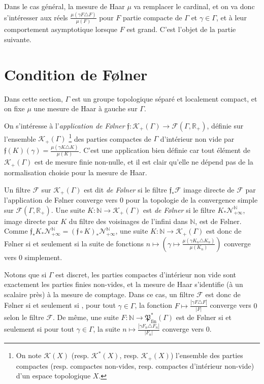 \documentclass[a4paper,12pt]{article}
\newcommand{\R}{\mathbb{R}}
\newcommand{\N}{\mathbb{N}}
\newcommand{\abs}[1]{\left\vert#1\right\vert}
\newcommand{\card}[1]{\abs{#1}}
\newcommand{\ssi}{si et seulement si }
\newcommand{\comp}{\circ}
\newcommand{\nhds}{\mathcal{N}}
\newcommand{\finparts}{\mathfrak{P}_{\mathrm{fin}}}
\begin{document}
Dans le cas général, la mesure de Haar $\mu$ va remplacer le cardinal, et on va donc s'intéresser aux réels $\frac{\mu(\gamma F \triangle F)}{\mu(F)}$ 
pour $F$ partie compacte de $\Gamma$ et $\gamma\in\Gamma$, et à leur comportement asymptotique
lorsque $F$ est grand. C'est l'objet de la partie suivante.

\section{Condition de F\o{}lner}

Dans cette section, $\Gamma$ est un groupe topologique séparé et localement compact, et on fixe 
$\mu$ une mesure de Haar à gauche sur $\Gamma$.

On s'intéresse à l'\emph{application de F\o{}lner} $\mathfrak{f} : \mathcal{K}_+(\Gamma) \to \mathcal{F}(\Gamma, \R_+)$, définie sur l'ensemble 
$\mathcal{K}_+(\Gamma)$
\footnote{On note $\mathcal{K}(X)$ (resp. $\mathcal{K}^*(X)$, resp. $\mathcal{K}_+(X)$) l'ensemble des parties compactes 
(resp. compactes non-vides, resp. compactes d'intérieur non-vide) d'un espace topologique $X$. }
des parties compactes de $\Gamma$ d'intérieur non vide par $\mathfrak{f}(K)(\gamma) = \frac{\mu(\gamma K \triangle K)}{\mu(K)}$.
C'est une application bien définie car tout élément de $\mathcal{K}_+(\Gamma)$ est de mesure finie non-nulle,
et il est clair qu'elle ne dépend pas de la normalisation choisie pour la mesure de Haar.

Un filtre $\mathscr{F}$ sur $\mathcal{K}_+(\Gamma)$ est dit \emph{de F\o{}lner} si le filtre $\mathfrak{f}_*\mathscr{F}$ image directe 
de $\mathscr{F}$ par l'application de F\o{}lner converge vers $0$ pour la topologie de la convergence 
simple
sur $\mathcal{F}(\Gamma, \R_+)$.
Une suite $K:\N\to\mathcal{K}_+(\Gamma)$ est \emph{de F\o{}lner} si le filtre $K_*\nhds_{+\infty}^\N$, image directe par $K$ du filtre des
voisinages de l'infini dans $\N$, est de F\o{}lner. Comme $\mathfrak{f}_*K_*\nhds_{+\infty}^\N = (\mathfrak{f}\comp K)_*\nhds_{+\infty}^\N$,
une suite $K:\N\to\mathcal{K}_+(\Gamma)$ est donc de F\o{}lner \ssi la suite de fonctions
$n\mapsto\left(\gamma\mapsto\frac{\mu(\gamma K_n\triangle K_n)}{\mu(K_n)}\right)$ converge vers $0$
simplement.

Notons que si $\Gamma$ est discret, 
les parties compactes d'intérieur non vide sont exactement les parties finies non-vides,
et la mesure de Haar s'identifie (à un scalaire près) à la mesure de comptage. Dans ce cas, un filtre $\mathscr{F}$
est donc de F\o{}lner \ssi, pour tout $\gamma\in\Gamma$, la fonction $F\mapsto \frac{\card{\gamma F\triangle F}}{\card{F}}$ 
converge vers $0$ selon le filtre $\mathscr{F}$. De même, une suite $F:\N\to\finparts^*(\Gamma)$
est de F\o{}lner \ssi pour tout $\gamma\in\Gamma$, la suite $n\mapsto\frac{\card{\gamma F_n\triangle F_n}}{\card{F_n}}$ converge 
vers $0$.
\end{document}
